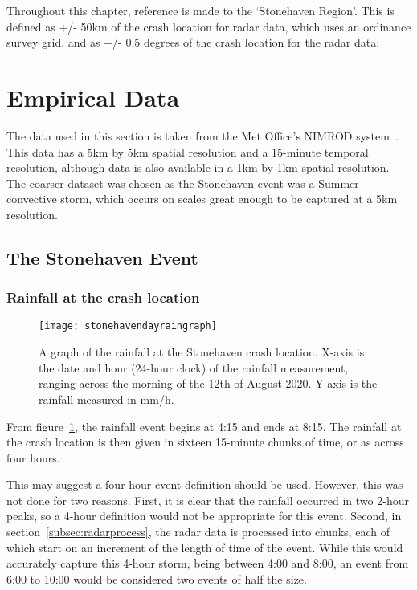 
Throughout this chapter,
    reference is made to the `Stonehaven Region'.
This is defined as +/- 50km of the crash location for radar data,
    which uses an ordinance survey grid,
    and as +/- 0.5 degrees of the crash location for the radar data.

\section{Empirical Data}\label{sec:def}

The data used in this section is taken from the Met Office's NIMROD system~\cite{radar_data}.
This data has a 5km by 5km spatial resolution and a 15-minute temporal resolution,
    although data is also available in a 1km by 1km spatial resolution.
The coarser dataset was chosen as the Stonehaven event was a Summer convective storm,
    which occurs on scales great enough to be captured at a 5km resolution.

\subsection{The Stonehaven Event}\label{subsec:actualevent}

\subsubsection{Rainfall at the crash location}

\begin{figure}[H]
    \begin{center}
    \texttt{[image: stonehavendayraingraph]}
    \end{center}
    \caption[A graph of the rainfall at the Stonehaven crash location.]{
        A graph of the rainfall at the Stonehaven crash location.
    X-axis is the date and hour (24-hour clock) of the rainfall measurement,
        ranging across the morning of the 12th of August 2020.
    Y-axis is the rainfall measured in mm/h.}
    \label{fig:stonehavendayraingraph}
\end{figure}

From figure~\ref{fig:stonehavendayraingraph},
    the rainfall event begins at 4:15 and ends at 8:15.
The rainfall at the crash location is then given in sixteen 15-minute chunks of time,
    or as across four hours.

This may suggest a four-hour event definition should be used.
However, this was not done for two reasons.
First, it is clear that the rainfall occurred in two 2-hour peaks,
 so a 4-hour definition would not be appropriate for this event.
Second, in section~\ref{subsec:radarprocess},
    the radar data is processed into chunks,
    each of which start on an increment of the length of time of the event.
While this would accurately capture this 4-hour storm, being between 4:00 and 8:00,
    an event from 6:00 to 10:00 would be considered two events of half the size.

